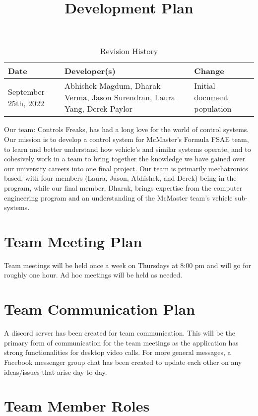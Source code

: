 \documentclass{article}
\title{Development Plan\\\progname}
\author{\authname}
\date{}
\begin{document}
\begin{table}[hp]
\caption{Revision History} \label{TblRevisionHistory}
\begin{tabularx}{\textwidth}{XXX}
\toprule
\textbf{Date} & \textbf{Developer(s)} & \textbf{Change}\\
\midrule
September 25th, 2022 & Abhishek Magdum, Dharak Verma, Jason Surendran, Laura Yang, Derek Paylor & Initial document population\\
\bottomrule
\end{tabularx}
\end{table}

\newpage

\maketitle

Our team: Controls Freaks, has had a long love for 
the world of control systems. Our mission is to develop 
a control system for McMaster’s Formula FSAE team, to learn 
and better understand how vehicle’s and similar systems operate, 
and to cohesively work in a team to bring together the knowledge 
we have gained over our university careers into one final project. 
Our team is primarily mechatronics based, with four members 
(Laura, Jason, Abhishek, and Derek) being in the program, while 
our final member, Dharak, brings expertise from the computer engineering 
program and an understanding of the McMaster team's vehicle sub-systems.

\section{Team Meeting Plan}
Team meetings will be held once a week on 
Thursdays at 8:00 pm and will go for roughly 
one hour. Ad hoc meetings will be held as needed.

\section{Team Communication Plan}

A discord server has been created for team communication. This will be 
the primary form of communication for the team meetings as the application 
has strong functionalities for desktop video calls. For more general messages, 
a Facebook messenger group chat has been created to update each other on any 
ideas/issues that arise day to day.
\\
\section{Team Member Roles}
\end{document}
